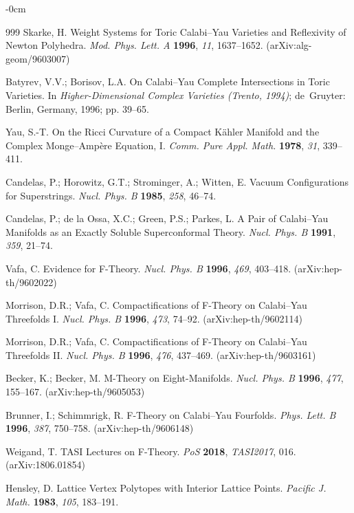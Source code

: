 \documentclass[appliedmath,article,submit,moreauthors]{Definitions/mdpi}
\begin{document}
\begin{adjustwidth}{-\extralength}{0cm}
\begin{thebibliography}{999}
Skarke, H.
Weight Systems for Toric Calabi--Yau Varieties and Reflexivity of Newton Polyhedra.
\textit{Mod. Phys. Lett. A} \textbf{1996}, \textit{11}, 1637--1652.
(arXiv:alg-geom/9603007)

Batyrev, V.V.; Borisov, L.A.
On Calabi--Yau Complete Intersections in Toric Varieties.
In \textit{Higher-Dimensional Complex Varieties (Trento, 1994)};
de~Gruyter: Berlin, Germany, 1996; pp. 39--65.

Yau, S.-T.
On the Ricci Curvature of a Compact K\"ahler Manifold and the Complex
Monge--Amp\`ere Equation, I.
\textit{Comm. Pure Appl. Math.} \textbf{1978}, \textit{31}, 339--411.

Candelas, P.; Horowitz, G.T.; Strominger, A.; Witten, E.
Vacuum Configurations for Superstrings.
\textit{Nucl. Phys. B} \textbf{1985}, \textit{258}, 46--74.

Candelas, P.; de la Ossa, X.C.; Green, P.S.; Parkes, L.
A Pair of Calabi--Yau Manifolds as an Exactly Soluble Superconformal Theory.
\textit{Nucl. Phys. B} \textbf{1991}, \textit{359}, 21--74.

Vafa, C.
Evidence for F-Theory.
\textit{Nucl. Phys. B} \textbf{1996}, \textit{469}, 403--418.
(arXiv:hep-th/9602022)

Morrison, D.R.; Vafa, C.
Compactifications of F-Theory on Calabi--Yau Threefolds I.
\textit{Nucl. Phys. B} \textbf{1996}, \textit{473}, 74--92.
(arXiv:hep-th/9602114)

Morrison, D.R.; Vafa, C.
Compactifications of F-Theory on Calabi--Yau Threefolds II.
\textit{Nucl. Phys. B} \textbf{1996}, \textit{476}, 437--469.
(arXiv:hep-th/9603161)

Becker, K.; Becker, M.
M-Theory on Eight-Manifolds.
\textit{Nucl. Phys. B} \textbf{1996}, \textit{477}, 155--167.
(arXiv:hep-th/9605053)

Brunner, I.; Schimmrigk, R.
F-Theory on Calabi--Yau Fourfolds.
\textit{Phys. Lett. B} \textbf{1996}, \textit{387}, 750--758.
(arXiv:hep-th/9606148)

Weigand, T.
TASI Lectures on F-Theory.
\textit{PoS} \textbf{2018}, \textit{TASI2017}, 016.
(arXiv:1806.01854)

Hensley, D.
Lattice Vertex Polytopes with Interior Lattice Points.
\textit{Pacific J. Math.} \textbf{1983}, \textit{105}, 183--191.


\end{thebibliography}
\end{adjustwidth}
\end{document}
